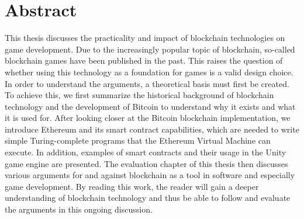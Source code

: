 \chapter{Abstract}\label{Abstract}
This thesis discusses the practicality and impact of blockchain technologies on game development.
Due to the increasingly popular topic of blockchain, so-called blockchain games have been published in the past.
This raises the question of whether using this technology as a foundation for games is a valid design choice.
In order to understand the arguments, a theoretical basis must first be created. 
To achieve this, we first summarize the historical background of blockchain technology and the development of Bitcoin to understand why it exists and what it is used for. 
After looking closer at the Bitcoin blockchain implementation, we introduce Ethereum and its smart contract capabilities, which are needed to write simple Turing-complete programs that the Ethereum Virtual Machine can execute.
In addition, examples of smart contracts and their usage in the Unity game engine are presented.
The evaluation chapter of this thesis then discusses various arguments for and against blockchain as a tool in software and especially game development.
By reading this work, the reader will gain a deeper understanding of blockchain technology and thus be able to follow and evaluate the arguments in this ongoing discussion.
